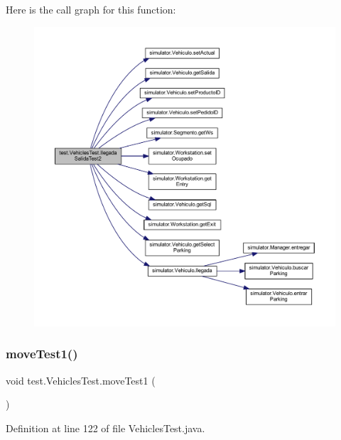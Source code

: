 Here is the call graph for this function\+:\nopagebreak
\begin{figure}[H]
\begin{center}
\leavevmode
\includegraphics[width=350pt]{classtest_1_1_vehicles_test_a7345ea4de2d3d0f0ebd9fd8d7701c13f_cgraph}
\end{center}
\end{figure}
\mbox{\label{classtest_1_1_vehicles_test_a706455718c34d3c7bc6a0cb2917f2ebc}} 
\subsubsection{\texorpdfstring{move\+Test1()}{moveTest1()}}
{\footnotesize\ttfamily void test.\+Vehicles\+Test.\+move\+Test1 (\begin{DoxyParamCaption}{ }\end{DoxyParamCaption})}



Definition at line 122 of file Vehicles\+Test.\+java.

